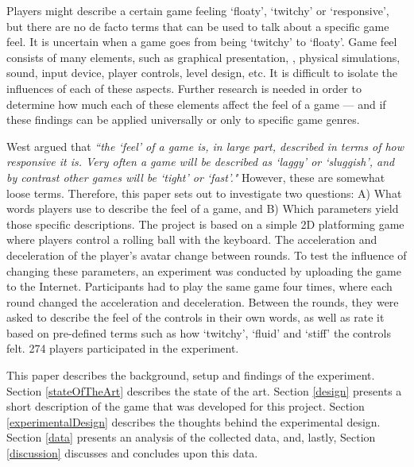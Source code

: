 Players might describe a certain game feeling `floaty', `twitchy' or `responsive', but there are no de facto terms that can be used to talk about a specific game feel. It is uncertain when a game goes from being `twitchy' to `floaty'. Game feel consists of many elements, such as graphical presentation, , physical simulations, sound, input device, player controls, level design, etc. It is difficult to isolate the influences of each of these aspects. Further research is needed in order to determine how much each of these elements affect the feel of a game --- and if these findings can be applied universally or only to specific game genres.

West argued that \textit{``the `feel' of a game is, in large part, described in terms of how responsive it is. Very often a game will be described as `laggy' or `sluggish', and by contrast other games will be `tight' or `fast'."} \cite{measure_lag} However, these are somewhat loose terms. Therefore, this paper sets out to investigate two questions: A) What words players use to describe the feel of a game, and B) Which parameters yield those specific descriptions. The project is based on a simple 2D platforming game where players control a rolling ball with the keyboard. The acceleration and deceleration of the player's avatar change between rounds. To test the influence of changing these parameters, an experiment was conducted by uploading the game to the Internet. Participants had to play the same game four times, where each round changed the acceleration and deceleration. Between the rounds, they were asked to describe the feel of the controls in their own words, as well as rate it based on pre-defined terms such as how `twitchy', `fluid' and `stiff' the controls felt. 274 players participated in the experiment.


This paper describes the background, setup and findings of the experiment. Section \ref{stateOfTheArt} describes the state of the art. Section \ref{design} presents a short description of the game that was developed for this project. Section \ref{experimentalDesign} describes the thoughts behind the experimental design. Section \ref{data} presents an analysis of the collected data, and, lastly, Section \ref{discussion} discusses and concludes upon this data.

